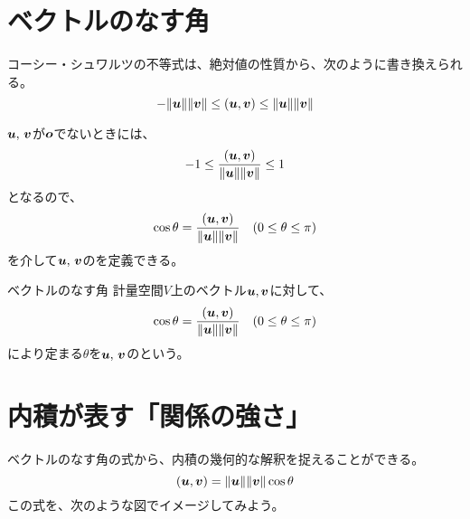 \documentclass[../../../topic_linear-algebra]{subfiles}
\begin{document}
\sectionline
\section{ベクトルのなす角}

コーシー・シュワルツの不等式は、絶対値の性質から、次のように書き換えられる。
\begin{equation*}
  - \| \vb*{u} \| \| \vb*{v} \| \leq (\vb*{u}, \vb*{v}) \leq \| \vb*{u} \| \| \vb*{v} \|
\end{equation*}

$\vb*{u},\,\vb*{v}$が$\vb*{o}$でないときには、
\begin{equation*}
  -1 \leq \frac{(\vb*{u}, \vb*{v})}{\|\vb*{u}\| \|\vb*{v}\|} \leq 1
\end{equation*}
となるので、
\begin{equation*}
  \cos \theta = \frac{(\vb*{u}, \vb*{v})}{\|\vb*{u}\| \|\vb*{v}\|} \quad (0 \leq \theta \leq \pi)
\end{equation*}
を介して$\vb*{u},\,\vb*{v}$のを定義できる。

\begin{definition}{ベクトルのなす角}\label{def:angle-between-vectors}
  計量空間$V$上のベクトル$\vb*{u},\vb*{v}$に対して、
  \begin{equation*}
    \cos \theta = \frac{(\vb*{u}, \vb*{v})}{\|\vb*{u}\| \|\vb*{v}\|} \quad (0 \leq \theta \leq \pi)
  \end{equation*}
  により定まる$\theta$を$\vb*{u},\,\vb*{v}$のという。
\end{definition}

\sectionline
\section{内積が表す「関係の強さ」}\label{sec:inner-product-similarity}

ベクトルのなす角の式から、内積の幾何的な解釈を捉えることができる。
\begin{equation*}
  (\vb*{u}, \vb*{v}) = \| \vb*{u} \| \| \vb*{v} \| \cos \theta
\end{equation*}
この式を、次のような図でイメージしてみよう。
\end{document}
